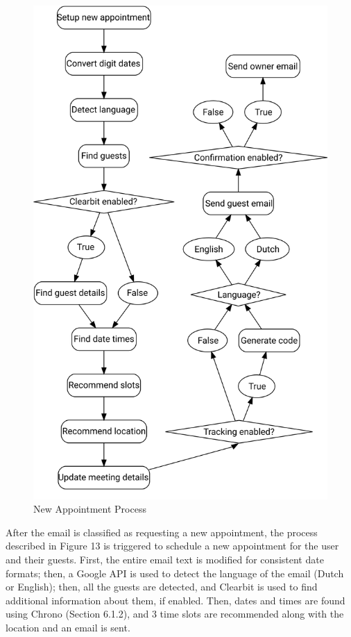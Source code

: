 \documentclass{article}
\begin{document}
\begin{figure}\centering
	\includegraphics[scale=0.4]{schedule-process.png}
	\caption{New Appointment Process}
\end{figure}

After the email is classified as requesting a new appointment, the process described in Figure 13 is triggered to schedule a new appointment for the user and their guests. First, the entire email text is modified for consistent date formats; then, a Google API is used to detect the language of the email (Dutch or English); then, all the guests are detected, and Clearbit is used to find additional information about them, if enabled. Then, dates and times are found using Chrono (Section 6.1.2), and 3 time slots are recommended along with the location and an email is sent.
\end{document}

